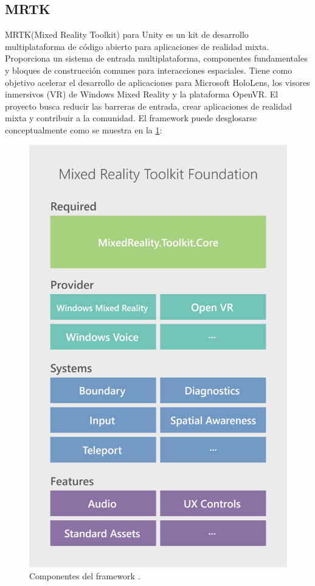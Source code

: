 

\subsection{MRTK}

MRTK(Mixed Reality Toolkit) para Unity es un kit de desarrollo multiplataforma de código abierto para aplicaciones de realidad mixta. Proporciona un sistema de entrada multiplataforma, componentes fundamentales y bloques de construcción comunes para interacciones espaciales. Tiene como objetivo acelerar el desarrollo de aplicaciones para Microsoft HoloLens, los visores inmersivos (VR) de Windows Mixed Reality y la plataforma OpenVR. El proyecto busca reducir las barreras de entrada, crear aplicaciones de realidad mixta y contribuir a la comunidad. El framework puede desglosarse conceptualmente como se muestra en la \ref{fig:mrtk}:

\begin{figure}[htpb]
	\centering
	\includegraphics[scale=0.1]{./Figures/mrtk.png}
	\caption{Componentes del framework \protect\footnotemark.}
	\label{fig:mrtk}
\end{figure}

